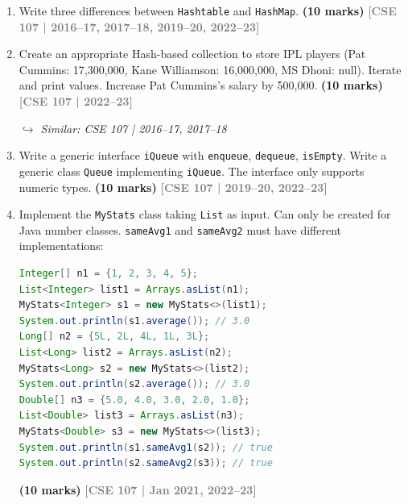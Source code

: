 \documentclass[12pt,a3paper]{article}
\newcommand{\yr}[1]{\hfill\textcolor{gray}{\small\textbf{[#1]}}}
\newcommand{\mk}[1]{\textcolor{orange!70!black}{\small\textbf{(#1 marks)}}}
\newcommand{\variant}[1]{\par\vspace{1pt}\textcolor{blue!50!black}%
  {\footnotesize\textit{$\hookrightarrow$ Similar: #1}}}
\begin{document}
\begin{enumerate}





\item Write three differences between \texttt{Hashtable} and \texttt{HashMap}. \mk{10}
\yr{CSE 107 | 2016--17, 2017--18, 2019--20, 2022--23}






\item Create an appropriate Hash-based collection to store IPL players (Pat Cummins: 17{,}300{,}000, Kane Williamson: 16{,}000{,}000, MS Dhoni: null). Iterate and print values. Increase Pat Cummins's salary by 500{,}000. \mk{10}
\yr{CSE 107 | 2022--23}
\variant{CSE 107 | 2016--17, 2017--18}






\item Write a generic interface \texttt{iQueue} with \texttt{enqueue}, \texttt{dequeue}, \texttt{isEmpty}. Write a generic class \texttt{Queue} implementing \texttt{iQueue}. The interface only supports numeric types. \mk{10}
\yr{CSE 107 | 2019--20, 2022--23}







\item Implement the \texttt{MyStats} class taking \texttt{List} as input. Can only be created for Java number classes. \texttt{sameAvg1} and \texttt{sameAvg2} must have different implementations:
\begin{lstlisting}[language=Java]
Integer[] n1 = {1, 2, 3, 4, 5};
List<Integer> list1 = Arrays.asList(n1);
MyStats<Integer> s1 = new MyStats<>(list1);
System.out.println(s1.average()); // 3.0
Long[] n2 = {5L, 2L, 4L, 1L, 3L};
List<Long> list2 = Arrays.asList(n2);
MyStats<Long> s2 = new MyStats<>(list2);
System.out.println(s2.average()); // 3.0
Double[] n3 = {5.0, 4.0, 3.0, 2.0, 1.0};
List<Double> list3 = Arrays.asList(n3);
MyStats<Double> s3 = new MyStats<>(list3);
System.out.println(s1.sameAvg1(s2)); // true
System.out.println(s2.sameAvg2(s3)); // true
\end{lstlisting}
\mk{10}
\yr{CSE 107 | Jan 2021, 2022--23}


\end{enumerate}
\end{document}
